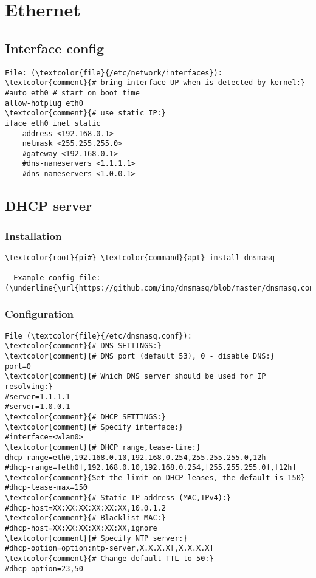 \documentclass[10pt, a4paper, onecolumn, openany]{book} %
\begin{document}
\section{Ethernet}
\subsection{Interface config}
\begin{Verbatim}[commandchars=\\\{\}]
File: (\textcolor{file}{/etc/network/interfaces}):
\textcolor{comment}{# bring interface UP when is detected by kernel:}
#auto eth0 # start on boot time
allow-hotplug eth0
\textcolor{comment}{# use static IP:}
iface eth0 inet static
    address <192.168.0.1>
    netmask <255.255.255.0>
    #gateway <192.168.0.1>
    #dns-nameservers <1.1.1.1>
    #dns-nameservers <1.0.0.1>
\end{Verbatim}

\subsection{DHCP server}
\subsubsection{Installation}
\begin{Verbatim}[commandchars=\\\{\}]
    \textcolor{root}{pi#} \textcolor{command}{apt} install dnsmasq
    
- Example config file:
(\underline{\url{https://github.com/imp/dnsmasq/blob/master/dnsmasq.conf.example}})
\end{Verbatim}

\subsubsection{Configuration}
\begin{Verbatim}[commandchars=\\\{\}]
File (\textcolor{file}{/etc/dnsmasq.conf}):
\textcolor{comment}{# DNS SETTINGS:}
\textcolor{comment}{# DNS port (default 53), 0 - disable DNS:}
port=0
\textcolor{comment}{# Which DNS server should be used for IP resolving:}
#server=1.1.1.1
#server=1.0.0.1
\textcolor{comment}{# DHCP SETTINGS:}
\textcolor{comment}{# Specify interface:}
#interface=<wlan0>
\textcolor{comment}{# DHCP range,lease-time:}
dhcp-range=eth0,192.168.0.10,192.168.0.254,255.255.255.0,12h
#dhcp-range=[eth0],192.168.0.10,192.168.0.254,[255.255.255.0],[12h]
\textcolor{comment}{Set the limit on DHCP leases, the default is 150}
#dhcp-lease-max=150
\textcolor{comment}{# Static IP address (MAC,IPv4):}
#dhcp-host=XX:XX:XX:XX:XX:XX,10.0.1.2
\textcolor{comment}{# Blacklist MAC:}
#dhcp-host=XX:XX:XX:XX:XX:XX,ignore
\textcolor{comment}{# Specify NTP server:}
#dhcp-option=option:ntp-server,X.X.X.X[,X.X.X.X]
\textcolor{comment}{# Change default TTL to 50:}
#dhcp-option=23,50
\end{Verbatim}
\end{document}
